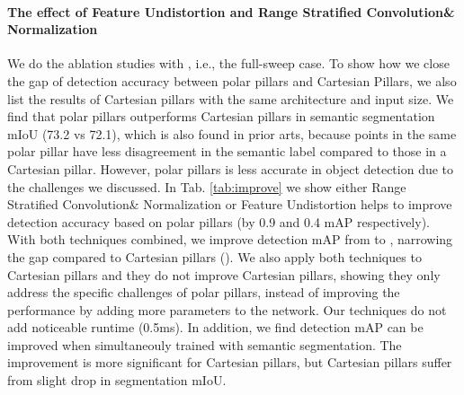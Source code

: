 \documentclass{article}
\begin{document}
 \paragraph{The effect of Feature Undistortion and Range Stratified Convolution\& Normalization} 
 We do the ablation studies with , i.e., the full-sweep case. To show how we close the gap of detection accuracy between polar pillars and Cartesian Pillars, we also list the results of Cartesian pillars with the same architecture and input size. We find that polar pillars outperforms Cartesian pillars in semantic segmentation mIoU (73.2 vs 72.1), which is also found in prior arts\cite{zhang2020polarnet}, because points in the same polar pillar have less disagreement in the semantic label compared to those in a Cartesian pillar. However, polar pillars is less accurate in object detection due to the challenges we discussed. In Tab. \ref{tab:improve} we show either Range Stratified Convolution\& Normalization or Feature Undistortion helps to improve detection accuracy based on polar pillars (by 0.9 and 0.4 mAP respectively). With both techniques combined, we improve detection mAP from  to , narrowing the gap compared to Cartesian pillars (). We also apply both techniques to Cartesian pillars and they do not improve Cartesian pillars, showing they only address the specific challenges of polar pillars, instead of improving the performance by adding more parameters to the network. Our techniques do not add noticeable runtime (0.5ms). In addition, we find detection mAP can be improved when simultaneouly trained with semantic segmentation. The improvement is more significant for Cartesian pillars, but Cartesian pillars suffer from slight drop in segmentation mIoU.
\begin{table*}[h]
  \caption{Ablation Studies on the validation split of nuScenes.}
  \label{tab:improve}
  \centering
\end{table*}
\end{document}
